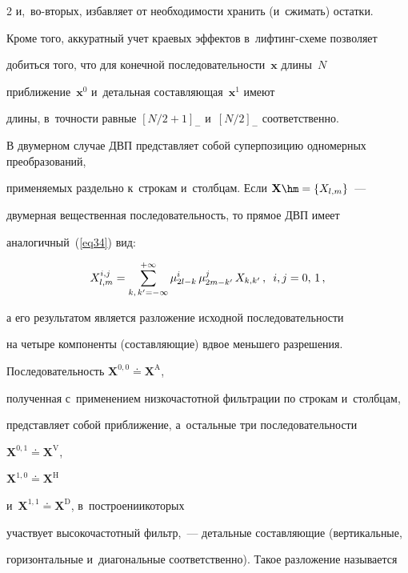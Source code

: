\begin{multicols}{2}
и,~во-вто\-рых, избавляет от необходимости хранить (и~сжимать) остатки. 

Кроме того, аккуратный учет краевых эффектов в~лиф\-тинг-схе\-ме позволяет 

добиться того, что для конечной последовательности~$\mathbf{ x}$ длины~$N$ 

приближение~$\mathbf{ x}^0$ и~детальная составляющая~$\mathbf{x}^1$ имеют 

длины, в~точ\-ности равные $[N/2+1]_-$ и~$[N/2]_-$ соответственно.



В двумерном случае ДВП представляет собой суперпозицию одномерных преобразований, 

применяемых раздельно к~строкам и~столбцам. Если $\mathbf{X}\hm=\{X_{l,m}\}$~--- 

двумерная вещественная последовательность, то прямое ДВП имеет 

аналогичный~(\ref{eq34}) вид:



\noindent

$$

X_{l,m}^{i,j}=\sum\limits_{k,\,k'=-\infty}^{+\infty}

\mu_{2l-k}^{i}\,\mu_{2m-k'}^{j}\,X_{k,k'}\,,

\enskip i,j=0,\,1\,,

$$

а его результатом является разложение исходной последовательности 

на четыре компоненты (со\-став\-ля\-ющие) вдвое меньшего разрешения.



Последовательность $\mathbf{X}^{0,0}\doteq\mathbf{X}^{\mathrm{A}}$, 

полученная с~применением низкочастотной фильтрации по строкам и~столбцам, 

представляет собой приближение, а~остальные три последовательности

$\mathbf{X}^{0,1}\doteq\mathbf{X}^{\mathrm{V}}$, 

$\mathbf{X}^{1,0}\doteq\mathbf{X}^{\mathrm{H}}$ 

и~$\mathbf{X}^{1,1}\doteq\mathbf{X}^{\mathrm{D}}$, в~построении\linebreak которых 

участвует высокочастотный фильтр,~--- детальные со\-став\-ля\-ющие (вертикальные, 

горизонтальные и~диагональные соответственно). Такое разложение называется 


\end{multicols}

